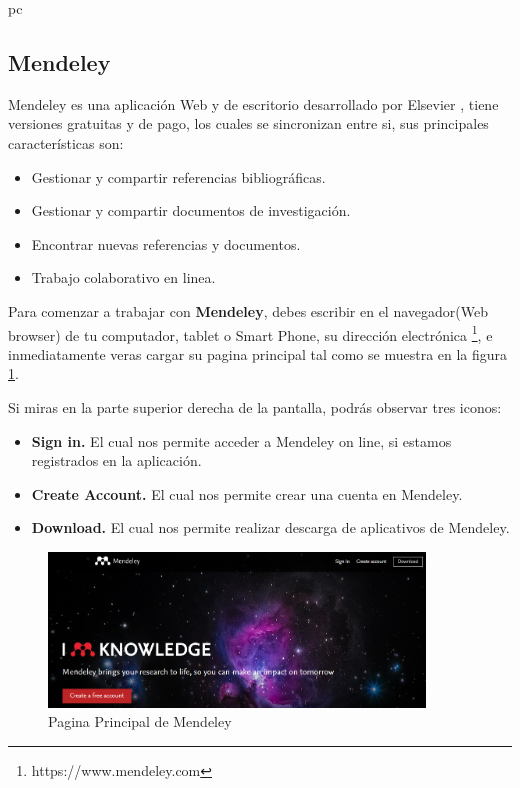 pc\documentclass[a4paper,12pt,openany]{book}
\begin{document}
\begin{itemize}
\section{Mendeley}

Mendeley es una aplicación Web y de escritorio desarrollado por Elsevier \cite{ElsevierElsevierKnowledge}, tiene versiones gratuitas y de pago, los cuales se sincronizan entre si, sus principales características son:

\begin{itemize}
\item Gestionar y compartir referencias bibliográficas.
\item Gestionar y compartir documentos de investigación.
\item Encontrar nuevas referencias y documentos.
\item Trabajo colaborativo en linea.
\end{itemize}

Para comenzar a trabajar con \textbf{Mendeley}, debes escribir en el navegador(Web browser) de tu computador, tablet o Smart Phone, su dirección electrónica \footnote{https://www.mendeley.com},
e inmediatamente veras cargar su pagina principal tal como se muestra en la figura \ref{fig:mendeley1}.

Si miras en la parte superior derecha de la pantalla, podrás observar tres iconos:

\begin{itemize}
\item \textbf{Sign in.} El cual nos permite acceder a Mendeley on line, si estamos registrados en la aplicación.
\item \textbf{Create Account.} El cual nos permite crear una cuenta en Mendeley. 
\item \textbf{Download.} El cual nos permite realizar descarga de aplicativos de Mendeley.
\end{itemize}

\begin{figure}[ht]
  \centering
	\includegraphics[width=10cm]{mendeley1.png}
\caption{Pagina Principal de Mendeley}
  \label{fig:mendeley1}
\end{figure}


\end{itemize}
\end{document}
